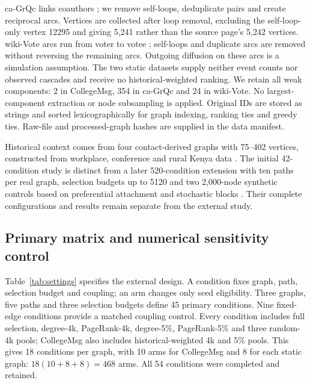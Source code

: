 \documentclass[smallextended]{svjour3}
\begin{document}
ca-GrQc links coauthors \cite{grqc}; we remove self-loops, deduplicate pairs and create reciprocal arcs. Vertices are collected after loop removal, excluding the self-loop-only vertex 12295 and giving 5,241 rather than the source page's 5,242 vertices. wiki-Vote arcs run from voter to votee \cite{signed,links}; self-loops and duplicate arcs are removed without reversing the remaining arcs. Outgoing diffusion on these arcs is a simulation assumption. The two static datasets supply neither event counts nor observed cascades and receive no historical-weighted ranking. We retain all weak components: 2 in CollegeMsg, 354 in ca-GrQc and 24 in wiki-Vote. No largest-component extraction or node subsampling is applied. Original IDs are stored as strings and sorted lexicographically for graph indexing, ranking ties and greedy ties. Raw-file and processed-graph hashes are supplied in the data manifest.

Historical context comes from four contact-derived graphs with 75--402 vertices, constructed from workplace, conference and rural Kenya data \cite{ref3,ref4,ref5,ref6}. The initial 42-condition study is distinct from a later 520-condition extension with ten paths per real graph, selection budgets up to 5120 and two 2,000-node synthetic controls based on preferential attachment and stochastic blocks \cite{ref17,ref18}. Their complete configurations and results remain separate from the external study.

\subsection{Primary matrix and numerical sensitivity control}
Table~\ref{tab:settings} specifies the external design. A condition fixes graph, path, selection budget and coupling; an arm changes only seed eligibility. Three graphs, five paths and three selection budgets define 45 primary conditions. Nine fixed-edge conditions provide a matched coupling control. Every condition includes full selection, degree-4k, PageRank-4k, degree-5\%, PageRank-5\% and three random-4k pools; CollegeMsg also includes historical-weighted 4k and 5\% pools. This gives 18 conditions per graph, with 10 arms for CollegeMsg and 8 for each static graph: $18(10+8+8)=468$ arms. All 54 conditions were completed and retained.
\end{document}
